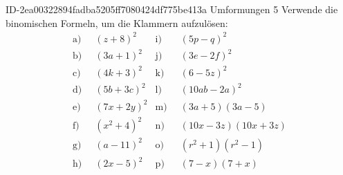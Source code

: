 \begin{exercise}
      {ID-2ea00322894fadba5205ff7080424df775be413a}
      {Umformungen 5}
  \ifproblem\problem
    \newcommand{\gap}{\;\;}%
    Verwende die binomischen Formeln, um die Klammern aufzulösen:
    \begin{align*}
      \text{a)}\gap & (z+8)^2 &
      \text{i)}\gap & (5p-q)^2
      \\
      \text{b)}\gap & (3a+1)^2 &
      \text{j)}\gap & (3e-2f)^2
      \\
      \text{c)}\gap & (4k+3)^2 &
      \text{k)}\gap & (6-5z)^2
      \\
      \text{d)}\gap & (5b+3c)^2 &
      \text{l)}\gap & (10ab-2a)^2
      \\
      \text{e)}\gap & (7x+2y)^2 &
      \text{m)}\gap & (3a+5)(3a-5)
      \\
      \text{f)}\gap & (x^2+4)^2 &
      \text{n)}\gap & (10x-3z)(10x+3z)
      \\
      \text{g)}\gap & (a-11)^2 &
      \text{o)}\gap & (r^2+1)(r^2-1)
      \\
      \text{h)}\gap & (2x-5)^2 &
      \text{p)}\gap & (7-x)(7+x)
    \end{align*}
  \fi
  \ifoutcome\outcome
    \newcommand{\toprow}[1]
    {%
      \makebox[20em][l]
      {%
        \ensuremath
        {%
          \displaystyle
          \phantom{\,=\:\,}%
          #1%
        }%
      }%
    }%

    \newcommand{\solutionA} { \text{a)}&\quad          (z+8)^2=z^2+16z+256           }
    \newcommand{\solutionB} { \text{b)}&\quad         (3a+1)^2=9a^2+6a+1             }
    \newcommand{\solutionC} { \text{c)}&\quad         (4k+3)^2=16k^2+24k+9           }
    \newcommand{\solutionD} { \text{d)}&\quad        (5b+3c)^2=25b^2+30bc+9c^2       }
    \newcommand{\solutionE} { \text{e)}&\quad        (7x+2y)^2=49x^2+28xy+4y^2       }
    \newcommand{\solutionF} { \text{f)}&\quad        (x^2+4)^2=x^4+8x^2+16           }
    \newcommand{\solutionG} { \text{g)}&\quad         (a-11)^2=a^2-22a+121           }
    \newcommand{\solutionH} { \text{h)}&\quad         (2x-5)^2=4x^2-20x+25           }
    \newcommand{\solutionI} { \text{i)}&\quad         (5p-q)^2=25p^2-10pq+q^2        }
    \newcommand{\solutionJ} { \text{j)}&\quad        (3e-2f)^2=9e^2-12ef+4f^2        }
    \newcommand{\solutionK} { \text{k)}&\quad         (6-5z)^2=36-60z+25z^2          }
    \newcommand{\solutionL} { \text{l)}&\quad      (10ab-2a)^2=100a^2b^2-40a^2b+4a^2 }
    \newcommand{\solutionM} { \text{m)}&\quad     (3a+5)(3a-5)=9a^2-25               }
    \newcommand{\solutionN} { \text{n)}&\quad (10x-3z)(10x+3z)=100x^2-9z^2           }
    \newcommand{\solutionO} { \text{o)}&\quad   (r^2+1)(r^2-1)=r^4-1                 }
    \newcommand{\solutionP} { \text{p)}&\quad       (7-x)(7+x)=49-x^2                }


\end{exercise}
